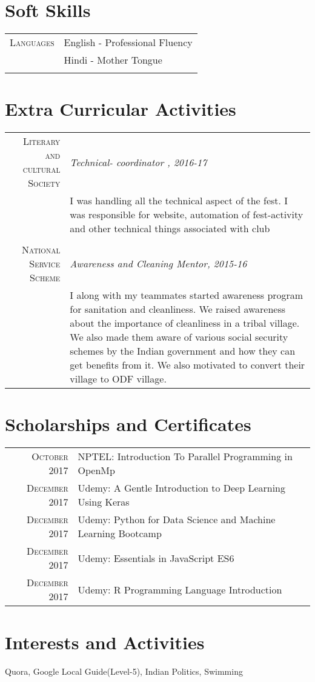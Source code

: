 \documentclass[a4paper,10pt]{article}
\begin{document}
\section{Soft Skills}
    \begin{tabular}{rl}
        \textsc{Languages} &English - Professional Fluency\\&Hindi - Mother Tongue\\ \\
    \end{tabular}

\section{Extra Curricular Activities}
    \begin{tabular}{r|p{11cm}}
        \textsc{Literary and cultural Society} & \emph{Technical- coordinator , 2016-17}\\&\footnotesize{I was handling all the technical aspect of the fest. I was responsible for website, automation of fest-activity and other technical things associated with club }\\ \\
        \textsc{National Service Scheme} & \emph{Awareness and Cleaning Mentor, 2015-16}\\&\footnotesize{I along with my teammates started awareness program for sanitation and cleanliness. We raised awareness about the importance of cleanliness in a tribal village. We also made them aware of various social security schemes by the Indian government and how they can get benefits from it. We also motivated to convert their village to ODF village.}
    \end{tabular}

\section{Scholarships and Certificates}
    \begin{tabular}{rl}
         \textsc{October} 2017 & NPTEL: Introduction To Parallel Programming in OpenMp \\
         \textsc{December} 2017 & Udemy: A Gentle Introduction to Deep Learning Using Keras \\
         \textsc{December} 2017 & Udemy:  Python for Data Science and Machine Learning Bootcamp   \\
         \textsc{December} 2017 & Udemy: Essentials in JavaScript ES6 \\
         \textsc{December} 2017 & Udemy: R Programming Language Introduction  
    \end{tabular}

\section{Interests and Activities}
    Quora, Google Local Guide(Level-5), Indian Politics, Swimming
\end{document}
